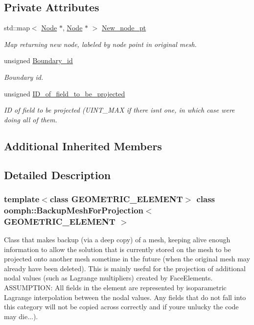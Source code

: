 \subsection*{Private Attributes}
\begin{DoxyCompactItemize}
\item 
std\+::map$<$ \hyperlink{classoomph_1_1Node}{Node} $\ast$, \hyperlink{classoomph_1_1Node}{Node} $\ast$ $>$ \hyperlink{classoomph_1_1BackupMeshForProjection_ae921b83792e20e1a5d974e1e89be6489}{New\+\_\+node\+\_\+pt}
\begin{DoxyCompactList}\small\item\em Map returning new node, labeled by node point in original mesh. \end{DoxyCompactList}\item 
unsigned \hyperlink{classoomph_1_1BackupMeshForProjection_a41581d95e01ec252aaa05b73f596d431}{Boundary\+\_\+id}
\begin{DoxyCompactList}\small\item\em Boundary id. \end{DoxyCompactList}\item 
unsigned \hyperlink{classoomph_1_1BackupMeshForProjection_aac26d2ee9ed6c7ee58f3f5c416be2047}{I\+D\+\_\+of\+\_\+field\+\_\+to\+\_\+be\+\_\+projected}
\begin{DoxyCompactList}\small\item\em ID of field to be projected (U\+I\+N\+T\+\_\+\+M\+AX if there isn\textquotesingle{}t one, in which case we\textquotesingle{}re doing all of them. \end{DoxyCompactList}\end{DoxyCompactItemize}
\subsection*{Additional Inherited Members}


\subsection{Detailed Description}
\subsubsection*{template$<$class G\+E\+O\+M\+E\+T\+R\+I\+C\+\_\+\+E\+L\+E\+M\+E\+NT$>$\newline
class oomph\+::\+Backup\+Mesh\+For\+Projection$<$ G\+E\+O\+M\+E\+T\+R\+I\+C\+\_\+\+E\+L\+E\+M\+E\+N\+T $>$}

Class that makes backup (via a deep copy) of a mesh, keeping alive enough information to allow the solution that is currently stored on the mesh to be projected onto another mesh sometime in the future (when the original mesh may already have been deleted). This is mainly useful for the projection of additional nodal values (such as Lagrange multipliers) created by Face\+Elements. A\+S\+S\+U\+M\+P\+T\+I\+ON\+: All fields in the element are represented by isoparametric Lagrange interpolation between the nodal values. Any fields that do not fall into this category will not be copied across correctly and if you\textquotesingle{}re unlucky the code may die...). 

